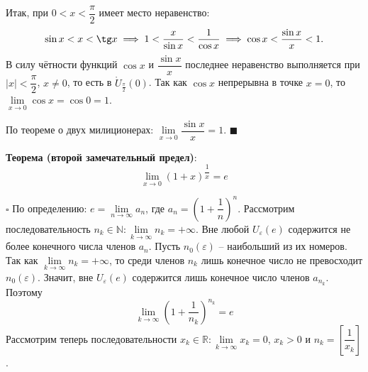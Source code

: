 \documentclass[12pt, a4paper, reqno]{article}
\begin{document}
    Итак, при $0 < x < \dfrac{\pi}{2}$ имеет место неравенство:
    \begin{equation*}
        \sin{x} < x < \tg x \implies 1 < \dfrac{x}{\sin{x}} < \dfrac{1}{\cos{x}} \implies
        \cos{x} < \dfrac{\sin{x}}{x} < 1.
    \end{equation*}
    В силу чётности функций $\cos{x}$ и $\dfrac{\sin{x}}{x}$ последнее неравенство выполняется при
    $|x| < \dfrac{\pi}{2}$, $x\neq 0$, то есть в $\mathring U_{\frac{\pi}{2}}(0)$. Так как
    $\cos{x}$ непрерывна в точке $x = 0$, то $\lim\limits_{x\to 0}\cos{x} = \cos{0} = 1$.

    По теореме о двух милиционерах: $\lim\limits_{x\to 0} \dfrac{\sin{x}}{x} = 1$. $\blacksquare$

    \textbf{Теорема (второй замечательный предел)}:
    \begin{equation*}
        \lim\limits_{x\to 0} (1 + x)^{\dfrac{1}{x}} = e
    \end{equation*}

    $\square$ По определению: $e = \lim\limits_{n\to\infty} a_n$, где
    $a_n = \left(1 +\dfrac{1}{n}\right)^n$. Рассмотрим последовательность $n_k\in\mathbb{N}:
    \lim\limits_{k\to\infty} n_k = +\infty$. Вне любой $U_{\varepsilon}(e)$ содержится не более
    конечного числа членов $a_n$. Пусть $n_0(\varepsilon)$ -- наибольший из их номеров. Так как
    $\lim\limits_{k\to\infty} n_k = +\infty$, то среди членов $n_k$ лишь конечное число не
    превосходит $n_0(\varepsilon)$. Значит, вне $U_{\varepsilon}(e)$ содержится лишь конечное число
    членов $a_{n_k}$. Поэтому
    \begin{equation}\label{condition}
        \lim\limits_{k\to\infty} (1 + \dfrac{1}{n_k})^{n_k} = e
    \end{equation}
    Рассмотрим теперь последовательности $x_k\in\mathbb{R}: \lim\limits_{k\to\infty} x_k = 0$,
    $x_k > 0$ и $n_k = [\dfrac{1}{x_k}]$.
\end{document}
